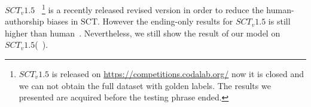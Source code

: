 %
%
%



%
$SCT_v1.5$~\cite{sharma2018tackling}
\footnote{$SCT_v1.5$ is released on \url{https://competitions.codalab.org/}
 now it is closed and we can not obtain the full dataset with golden labels. The results we presented are acquired before the testing phrase ended.}
is a recently released revised version in order to reduce the 
human-authorship biases in SCT. However the ending-only results for
$SCT_v1.5$ is still higher than human~\cite{sharma2018tackling}. 
Nevertheless, we still show the result of our model on $SCT_v1.5$(~).

